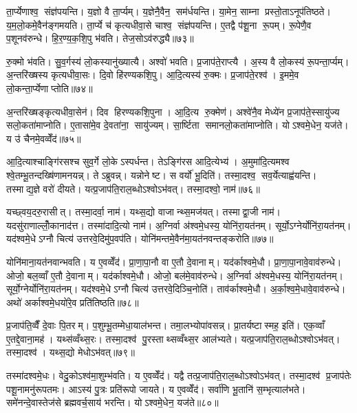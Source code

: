 ता॒र्प्येणाश्व॒ संज्ञ॑पयन्ति। य॒ज्ञो वै ता॒र्प्यम्। य॒ज्ञेनै॒वैन॒ सम॑र्धयन्ति। या॒मेन॒ साम्ना प्रस्तो॒ताऽनूप॑तिष्ठते। य॒म॒लो॒कमे॒वैन॑ङ्गमयति। ता॒र्प्ये च॑ कृत्यधीवा॒से चाश्व॒ संज्ञ॑पयन्ति। ए॒तद्वै प॑शू॒ना रू॒पम्। रू॒पेणै॒व प॒शूनव॑रुन्धे। हि॒र॒ण्य॒क॒शि॒पु भ॑वति। तेज॒सोऽव॑रुद्ध्यै॥७३॥

रु॒क्मो भ॑वति। सु॒व॒र्गस्य॑ लो॒कस्यानु॑ख्यात्यै। अश्वो॑ भवति। प्र॒जाप॑ते॒राप्त्यै। अ॒स्य वै लो॒कस्य॑ रू॒पन्ता॒र्प्यम्। अ॒न्तरि॑ख्षस्य कृत्यधीवा॒सः। दि॒वो हि॑रण्यकशि॒पु। आ॒दि॒त्यस्य॑ रु॒क्मः। प्र॒जाप॑ते॒रश्व॑। इ॒ममे॒व लो॒कन्ता॒र्प्येणाप्तोति॥७४॥

अ॒न्तरि॑ख्षङ्कृत्यधीवा॒सेन॑। दिव हिरण्यकशि॒पुना। आ॒दि॒त्य रु॒क्मेण॑। अश्वे॑नै॒व मेध्ये॑न प्र॒जाप॑ते॒स्सायु॑ज्य सलो॒कता॑माप्नोति। ए॒तासा॑मे॒व दे॒वता॑ना॒ सायु॑ज्यम्। सा॒र्ष्टिता समानलो॒कता॑माप्नोति। योऽश्वमे॒धेन॒ यज॑ते। य उ॑ चैनमे॒वव्वेँद॑॥७५॥\anuvakamend[अव॑रुध्या आप्नोत्य॒ष्टौ च॑]

आ॒दि॒त्याश्चाङ्गि॑रसश्च सुव॒र्गे लो॒केऽस्पर्धन्त। तेऽङ्गि॑रस आदि॒त्येभ्य॑। अ॒मुमा॑दि॒त्यमश्व श्वे॒तम्भू॒तन्दख्षि॑णामनयन्न्। तेऽब्रुवन्न्। यन्नोनेष्ट। स वर्यो॑ भू॒दिति॑। तस्मा॒दश्व॒ सव॒र्येत्याह्व॑यन्ति। तस्माद्य॒ज्ञे वरो॑ दीयते। यत्प्र॒जाप॑ति॒राल॒ब्धोऽश्वोऽभ॑वत्। तस्मा॒दश्वो॒ नाम॑॥७६॥

यच्छ्वय॒दरु॒रासीत्। तस्मा॒दर्वा॒ नाम॑। यथ्स॒द्यो वाजान्थ्स॒मज॑यत्। तस्माद्वा॒जी नाम॑। यदसु॑राणाल्लोँ॒कानाद॑त्त। तस्मा॑दादि॒त्यो नाम॑। अ॒ग्निर्वा अ॑श्वमे॒धस्य॒ योनि॑रा॒यत॑नम्। सूर्यो॒ऽग्नेर्योनि॑रा॒यत॑नम्। यद॑श्वमे॒धेऽग्नौ चित्य॑ उत्तरवे॒दिमु॑प॒वप॑ति। योनि॑मन्तमे॒वैन॑मा॒यत॑नवन्तङ्करोति॥७७॥

योनि॑माना॒यत॑नवान्भवति। य ए॒वव्वेँद॑। प्रा॒णा॒पा॒नौ वा ए॒तौ दे॒वानाम्। यद॑र्काश्वमे॒धौ। प्रा॒णा॒पा॒नावे॒वाव॑रुन्धे। ओजो॒ बल॒व्वाँ ए॒तौ दे॒वानाम्। यद॑र्काश्वमे॒धौ। ओजो॒ बल॑मे॒वाव॑रुन्धे। अ॒ग्निर्वा अ॑श्वमे॒धस्य॒ योनि॑रा॒यत॑नम्। सूर्यो॒ग्नेर्योनि॑रा॒यत॑नम्। यद॑श्वमे॒धेऽग्नौ चित्य॑ उत्तरवे॒दिञ्चि॒नोति॑। ताव॑र्काश्वमे॒धौ। अ॒र्का॒श्व॒मे॒धावे॒वाव॑रुन्धे। अथो॑ अर्काश्वमे॒धयो॑रे॒व प्रति॑तिष्ठति॥७८॥\anuvakamend[नाम॑ करोति॒ सूर्यो॒ऽग्नेर्योनि॑रा॒यत॑नञ्च॒त्वारि॑ च]

प्र॒जाप॑ति॒व्वैँ दे॒वाः पि॒तरम्। प॒शुम्भू॒तम्मेधा॒याल॑भन्त। तमा॒लभ्योपा॑वसन्न्। प्रा॒तर्यष्टास्मह॒ इति॑। एक॒व्वाँ ए॒तद्दे॒वाना॒मह॑। यथ्स॑व्वँथ्स॒रः। तस्मा॒दश्व॑ पु॒रस्ताथ्सव्वँथ्स॒र आल॑भ्यते। यत्प्र॒जाप॑ति॒राल॒ब्धोऽश्वोऽभ॑वत्। तस्मा॒दश्व॑। यथ्स॒द्यो मेधोऽभ॑वत्॥७९॥

तस्मा॑दश्वमे॒धः। वेदु॒कोऽश्व॑मा॒शुम्भ॑वति। य ए॒वव्वेँद॑। यद्वै तत्प्र॒जाप॑ति॒राल॒ब्धोऽश्वोऽभ॑वत्। तस्मा॒दश्व॑ प्र॒जाप॑तेः पशू॒नामनु॑रूपतमः। आऽस्य॑ पु॒त्रः प्रति॑रूपो जायते। य ए॒वव्वेँद॑। सर्वा॑णि भू॒तानि॑ स॒म्भृत्याल॑भते। समे॑नन्दे॒वास्तेज॑से ब्रह्मवर्च॒साय॑ भरन्ति। योऽश्वमे॒धेन॒ यज॑ते॥८०॥

